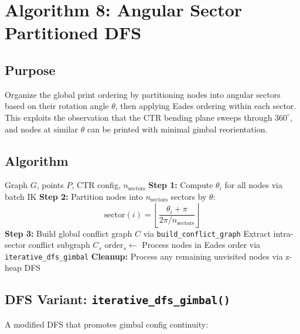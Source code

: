 \documentclass[11pt,a4paper]{article}
\newcommand{\funcname}[1]{\texttt{\textcolor{codepurple}{#1}}}
\begin{document}
\section{Algorithm 8: Angular Sector Partitioned DFS}
\label{sec:angular_sector}

\subsection{Purpose}

Organize the global print ordering by partitioning nodes into angular sectors based on their rotation angle $\theta$, then applying Eades ordering within each sector. This exploits the observation that the CTR bending plane sweeps through $360^\circ$, and nodes at similar $\theta$ can be printed with minimal gimbal reorientation.

\subsection{Algorithm}

\begin{algorithm}[H]
\caption{Angular Sector Partitioned DFS}
\begin{algorithmic}[1]
\Require Graph $G$, points $P$, CTR config, $n_\text{sectors}$
\State \textbf{Step 1:} Compute $\theta_i$ for all nodes via batch IK
\State \textbf{Step 2:} Partition nodes into $n_\text{sectors}$ sectors by $\theta$:
\[
\text{sector}(i) = \left\lfloor \frac{\theta_i + \pi}{2\pi / n_\text{sectors}} \right\rfloor
\]
\State \textbf{Step 3:} Build global conflict graph $C$ via \funcname{build\_conflict\_graph}
    \State Extract intra-sector conflict subgraph $C_s$
    \State $\text{order}_s \gets$ 
    \State Process nodes in Eades order via \funcname{iterative\_dfs\_gimbal}
\EndFor
\State \textbf{Cleanup:} Process any remaining unvisited nodes via z-heap DFS
\end{algorithmic}
\end{algorithm}

\subsection{DFS Variant: \funcname{iterative\_dfs\_gimbal()}}

A modified DFS that promotes gimbal config continuity:
\end{document}
